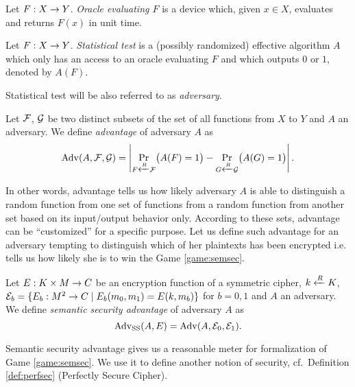 \begin{defn}[Oracle]
\label{def:oracle}
	Let $F:X\rightarrow Y$. {\em Oracle evaluating $F$} is a device which, given $x\in X$, evaluates and returns $F(x)$ in unit time.
\end{defn}

\begin{defn}   %
	Let $F:X\rightarrow Y$. {\em Statistical test} is a (possibly randomized) effective algorithm $A$ which only has an access to an oracle evaluating $F$ and which outputs $0$ or $1$, denoted by $A(F)$.
\end{defn}

\begin{note}
	Statistical test will be also referred to as {\em adversary}.
\end{note}

\begin{defn}[Advantage]
\label{def:advant}
	Let $\cal F$, $\cal G$ be two distinct subsets of the set of all functions from $X$ to $Y$ and $A$ an adversary. We define {\em advantage} of adversary $A$ as
	\[
		\operatorname*{Adv}(A,{\cal F},{\cal G}) = \left| \Pr\limits_{F\xleftarrow{R} {\cal F}}\bigl(A(F)=1\bigr) - \Pr\limits_{G\xleftarrow{R} {\cal G}}\bigl(A(G)=1\bigr) \right| .
	\]
\end{defn}

In other words, advantage tells us how likely adversary $A$ is able to distinguish a random function from one set of functions from a random function from another set based on its input/output behavior only. According to these sets, advantage can be ``customized'' for a specific purpose. Let us define such advantage for an adversary tempting to distinguish which of her plaintexts has been encrypted i.e. tells us how likely she is to win the Game \ref{game:semsec}.

\begin{defn}
\label{def:ssadvant}
	Let $E: K\times M\rightarrow C$ be an encryption function of a symmetric cipher, $k\xleftarrow{R} K$, ${\cal E}_b = \{E_b:M^2\rightarrow C \mid E_b(m_0,m_1) = E(k,m_b)\}$ for $b=0,1$ and $A$ an adversary. We define {\em semantic security advantage} of adversary $A$ as
	\[
		\operatorname*{Adv_{SS}}(A,E) = \operatorname*{Adv}(A,{\cal E}_0,{\cal E}_1) .
	\]
\end{defn}

Semantic security advantage gives us a reasonable meter for formalization of Game \ref{game:semsec}. We use it to define another notion of security, cf.\ Definition \ref{def:perfsec} (Perfectly Secure Cipher).

